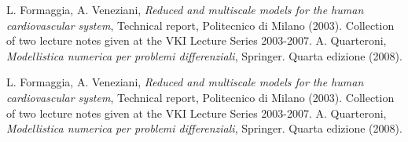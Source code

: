 \begin{thebibliography}{9}
    L. Formaggia, A. Veneziani, \emph{Reduced and multiscale models for the human cardiovascular system},
    Technical report, Politecnico di Milano (2003).
    Collection of two lecture notes given at the VKI Lecture Series 2003-2007.
    A. Quarteroni, \emph{Modellistica numerica per problemi differenziali},
    Springer. Quarta edizione (2008).
\end{thebibliography}

\begin{thebibliography}{For.Ven. 2003}
    	L. Formaggia, A. Veneziani, \emph{Reduced and multiscale models for the human cardiovascular system},
        Technical report, Politecnico di Milano (2003).
        Collection of two lecture notes given at the VKI Lecture Series 2003-2007.
    	A. Quarteroni, \emph{Modellistica numerica per problemi differenziali},
        Springer. Quarta edizione (2008).
\end{thebibliography}